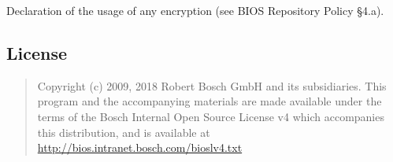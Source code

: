 Declaration of the usage of any encryption (see BIOS Repository Policy
§4.a).

\hypertarget{license}{%
\subsection{License}\label{license}}

\begin{quote}
Copyright (c) 2009, 2018 Robert Bosch GmbH and its subsidiaries. This
program and the accompanying materials are made available under the
terms of the Bosch Internal Open Source License v4 which accompanies
this distribution, and is available at
\url{http://bios.intranet.bosch.com/bioslv4.txt}
\end{quote}
